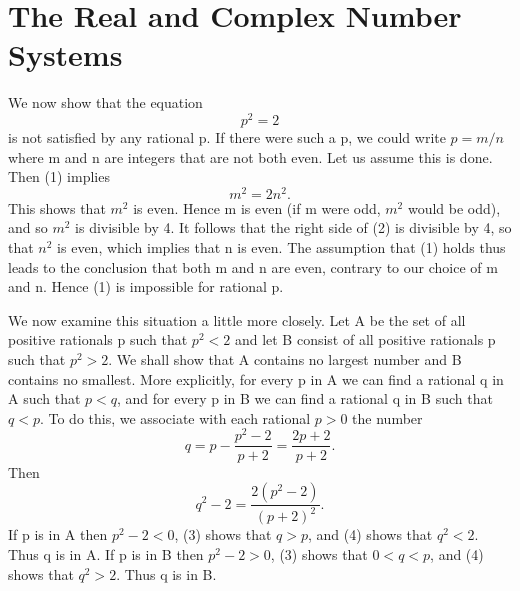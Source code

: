 
\chapter{The Real and Complex Number Systems}
\label{chap:rudin1}

\begin{example}[Proof that $p^2=2$ has no rational solution] %
  \label{ex:chap1:p_squared_eq_2_no_rational_sol}
  We now show that the equation
  \begin{equation}
    p^{2}=2
  \end{equation}
  is not satisfied by any rational p. If there were such a p, we
  could write $p=m/n$ where m and n are integers that are not both
  even. Let us assume this is done. Then (1) implies
  \begin{equation}
    m^{2}=2n^{2}.
  \end{equation}
  This shows that $m^{2}$ is even. Hence m is even (if m were odd,
  $m^{2}$ would be odd), and so $m^{2}$ is divisible by 4. It follows
  that the right side of (2) is divisible by 4, so that $n^{2}$ is
  even, which implies that n is even.
  The assumption that (1) holds thus leads to the conclusion that
  both m and n are even, contrary to our choice of m and n. Hence (1)
  is impossible for rational p.

  We now examine this situation a little more closely. Let A be the
  set of all positive rationals p such that $p^{2}<2$ and let B
  consist of all positive rationals p such that $p^{2}>2$. We shall
  show that A contains no largest number and B contains no smallest.
  More explicitly, for every p in A we can find a rational q in A
  such that $p<q$, and for every p in B we can find a rational q in B
  such that $q<p$.
  To do this, we associate with each rational $p>0$ the number
  \begin{equation}
    q=p-\frac{p^{2}-2}{p+2}=\frac{2p+2}{p+2}.
  \end{equation}
  Then
  \begin{equation}
    q^{2}-2=\frac{2(p^{2}-2)}{(p+2)^{2}}.
  \end{equation}
  If p is in A then $p^{2}-2<0$, (3) shows that $q>p$, and (4) shows
  that $q^{2}<2$. Thus q is in A.
  If p is in B then $p^{2}-2>0$, (3) shows that $0<q<p$, and (4)
  shows that $q^{2}>2$. Thus q is in B.
\end{example}

